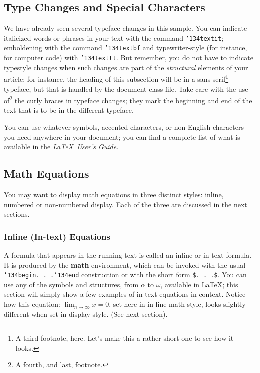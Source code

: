 \documentclass{sigkddExp}
\begin{document}
\subsection{Type Changes and Special Characters}
We have already seen several typeface changes in this sample.  You
can indicate italicized words or phrases in your text with
the command \texttt{{\char'134}textit}; emboldening with the
command \texttt{{\char'134}textbf}
and typewriter-style (for instance, for computer code) with
\texttt{{\char'134}texttt}.  But remember, you do not
have to indicate typestyle changes when such changes are
part of the \textit{structural} elements of your
article; for instance, the heading of this subsection will
be in a sans serif\footnote{A third footnote, here.
Let's make this a rather short one to
see how it looks.} typeface, but that is handled by the
document class file. Take care with the use
of\footnote{A fourth, and last, footnote.}
the curly braces in typeface changes; they mark
the beginning and end of
the text that is to be in the different typeface.

You can use whatever symbols, accented characters, or
non-English characters you need anywhere in your document;
you can find a complete list of what is
available in the \textit{\LaTeX\
User's Guide}\cite{Lamport:LaTeX}.

\subsection{Math Equations}
You may want to display math equations in three distinct styles:
inline, numbered or non-numbered display.  Each of
the three are discussed in the next sections.

\subsubsection{Inline (In-text) Equations}
A formula that appears in the running text is called an
inline or in-text formula.  It is produced by the
\textbf{math} environment, which can be
invoked with the usual \texttt{{\char'134}begin. . .{\char'134}end}
construction or with the short form \texttt{\$. . .\$}. You
can use any of the symbols and structures,
from $\alpha$ to $\omega$, available in
\LaTeX\cite{Lamport:LaTeX}; this section will simply show a
few examples of in-text equations in context. Notice how
this equation: \begin{math}\lim_{n\rightarrow \infty}x=0\end{math},
set here in in-line math style, looks slightly different when
set in display style.  (See next section).
\end{document}
